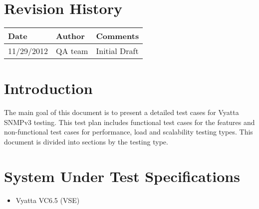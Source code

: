 \documentclass[a4paper,11pt]{article}
\begin{document}
\thispagestyle{empty}

\clearpage

\pagestyle{fancy}
\thispagestyle{fancy}

\tableofcontents

\newpage

\section{Revision History}


\begin{tabular}{|l|p{4cm}|p{10cm}|}
\hline
{\bf Date} & {\bf Author} & {\bf Comments} \\ 
\hline
11/29/2012 & QA team & Initial Draft \\ 
\hline
\end{tabular}

\section{Introduction}

The main goal of this document is to present a detailed test cases for Vyatta SNMPv3 testing. This test plan includes functional test cases for the features and non-functional test cases for  performance, load and scalability testing types. This document is divided into sections by the testing type. 


\section{System Under Test Specifications}
\begin{itemize}
\item Vyatta VC6.5 (VSE)
\end{itemize}
\end{document}
